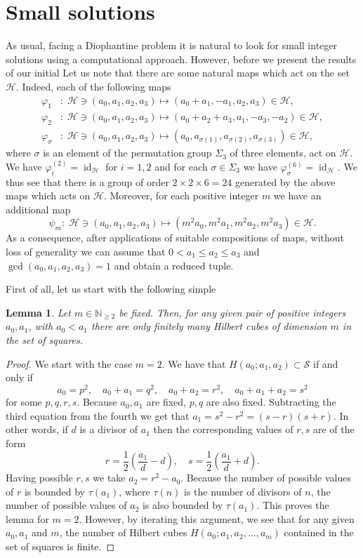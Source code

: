 \documentclass[10pt]{amsart}
\theoremstyle{plain}
\newtheorem{lem}[thm]{Lemma}
\def\cal{\mathcal}
\def\bbb{\mathbb}
\def\op{\operatorname}
\renewcommand{\phi}{\varphi}
\newcommand{\N}{\bbb{N}}
\begin{document}
\section{Small solutions}\label{sec2}
As usual, facing a Diophantine problem it is natural to look for small integer solutions using  a computational approach. However, before we present the results of our initial Let us note that there are some natural maps which act on the set $\cal{H}$. Indeed, each of the following maps  
\begin{align*}
\phi_{1}&:\;\cal{H}\ni (a_{0}, a_{1}, a_{2}, a_{3})\mapsto (a_{0}+a_{1}, -a_{1}, a_{2}, a_{3})\in \cal{H},\\
\phi_{2}&:\;\cal{H}\ni (a_{0}, a_{1}, a_{2}, a_{3})\mapsto (a_{0}+a_{2}+a_{3}, a_{1}, -a_{3}, -a_{2})\in \cal{H},\\
\phi_{\sigma}&:\;\cal{H}\ni (a_{0}, a_{1}, a_{2}, a_{3})\mapsto (a_{0}, a_{\sigma(1)}, a_{\sigma(2)}, a_{\sigma(3)})\in \cal{H},
\end{align*}
where $\sigma$ is an element of the permutation group $\Sigma_{3}$ of three elements, act on $\cal{H}$. We have $\phi_{i}^{(2)}=\op{id}_{\cal{H}}$ for $i=1, 2$ and for each $\sigma\in \Sigma_{3}$ we have $\phi_{\sigma}^{(6)}=\op{id}_{\cal{H}}$. We thus see that there is a group of order $2\times 2\times 6=24$ generated by the above maps which acts on $\cal{H}$. Moreover, for each positive integer $m$ we have an additional map
$$
\psi_{m}:\;\cal{H}\ni (a_{0}, a_{1}, a_{2}, a_{3})\mapsto  (m^2a_{0}, m^2a_{1}, m^2a_{2}, m^2a_{3})\in\cal{H}.
$$
As a consequence, after applications of suitable compositions of maps, without loss of generality we can assume that $0< a_{1}\leq a_{2}\leq a_{3}$ and $\gcd(a_{0}, a_{1}, a_{2}, a_{3})=1$ and obtain a reduced tuple.

First of all, let us start with the following simple
\begin{lem}
Let $m\in\N_{\geq 2}$ be fixed. Then, for any given pair of positive integers $a_{0}, a_{1}$, with $a_{0}<a_{1}$ there are only finitely many Hilbert cubes of dimension $m$ in the set of squares.
\end{lem}
\begin{proof}
We start with the case $m=2$. We have that $H(a_{0}; a_{1}, a_{2})\subset \cal{S}$ if and only if
$$
a_{0}=p^2,\quad  a_{0}+a_{1}=q^{2}, \quad  a_{0}+a_{2}=r^2, \quad a_{0}+a_{1}+a_{2}=s^2
$$
for some $p, q, r, s$. Because $a_{0}, a_{1}$ are fixed, $p, q$ are also fixed. Subtracting the third equation from the fourth we get that $a_{1}=s^2-r^2=(s-r)(s+r)$. In other words, if $d$ is a divisor of $a_{1}$ then the corresponding values of $r, s$ are of the form
$$
r=\frac{1}{2}\left(\frac{a_{1}}{d}-d\right),\quad s=\frac{1}{2}\left(\frac{a_{1}}{d}+d\right).
$$
Having possible $r, s$ we take $a_{2}=r^2-a_{0}$. 
Because the number of possible values of $r$ is bounded by $\tau(a_{1})$, where $\tau(n)$ is the number of divisors of $n$, the number of possible values of 
$a_{2}$ is also bounded by $\tau(a_{1})$. This proves the lemma for $m=2$. However, by iterating this argument, we see that for any given $a_{0}, a_{1}$ and $m$, the number of Hilbert cubes $H(a_{0}; a_{1}, a_{2},\ldots, a_{m})$ contained in the set of squares is finite.
\end{proof}
\end{document}
